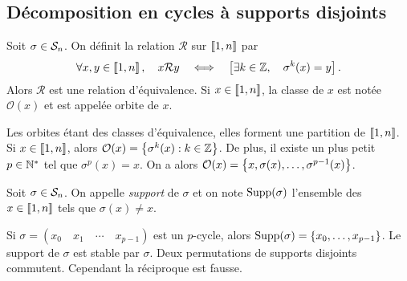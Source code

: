 \documentclass{magnolia}
\begin{document}

\subsection{Décomposition en cycles à supports disjoints}

\begin{definition}
Soit $\sigma\in\mathcal{S}_{n}$. On définit la relation $\mathcal{R}$ sur
$\left\llbracket 1,n\right\rrbracket$ par
\[\forall x,y\in\left\llbracket 1,n\right\rrbracket ,\quad x\mathcal{R}y \quad\Longleftrightarrow\quad
  \left[\exists k\in\mathbb{Z} ,\quad \sigma^k(x)=y\right].\]
Alors $\mathcal{R}$ est une relation d'équivalence. Si $x\in\left\llbracket 1,n\right\rrbracket$, la
classe de $x$ est notée $\mathcal{O}(x)$ et est appelée orbite de $x$.
\end{definition}

\begin{remarques}
\remarque Les orbites étant des classes d'équivalence, elles forment une
  partition de $\left\llbracket 1,n\right\rrbracket$.
\remarque Si $x\in\left\llbracket 1,n\right\rrbracket$, alors
  $\mathcal{O}(x)=\left\{\sigma^k(x) : k\in\mathbb{Z}\right\}$. De plus, il existe
  un plus petit $p\in{\mathbb{N}^*}$ tel que $\sigma^p(x)=x$. On a alors
  $\mathcal{O}(x)=\left\{x,\sigma(x),\ldots,\sigma^{p-1}(x)\right\}$.
\end{remarques}



\begin{definition}
Soit $\sigma\in\mathcal{S}_{n}$. On appelle \emph{support} de $\sigma$ et on note
$\operatorname{Supp}(\sigma)$ l'ensemble des $x\in\left\llbracket 1,n\right\rrbracket$ tels que $\sigma(x)\neq x$.
\end{definition}

\begin{remarques}
\remarque Si $\sigma=(x_0 \quad x_1 \quad \cdots \quad x_{p-1})$ est un $p$-cycle,
  alors ${\rm Supp}(\sigma)=\left\{x_0,\ldots,x_{p-1}\right\}$.
\remarque Le support de $\sigma$ est stable par $\sigma$.
\remarque Deux permutations de supports disjoints commutent. Cependant la
  réciproque est fausse.
\end{remarques}
\end{document}
